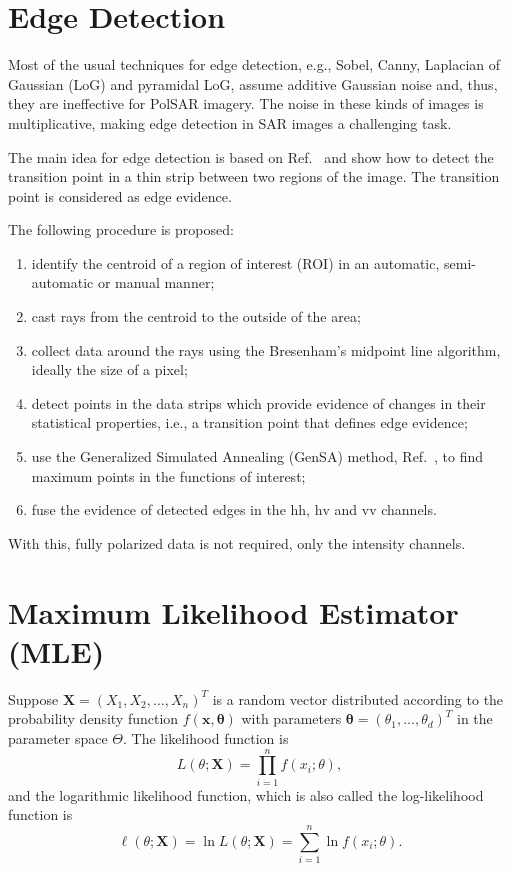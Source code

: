 \documentclass[conference]{IEEEtran}
\begin{document}
\section{Edge Detection}\label{sec_04}

Most of the usual techniques for edge detection, e.g., 
Sobel, Canny, Laplacian of Gaussian (LoG) and pyramidal LoG, assume additive Gaussian noise and, thus, they are ineffective for PolSAR imagery.
The noise in these kinds of images is multiplicative, making edge detection in SAR images a challenging task.

The main idea for edge detection is based on Ref.~\cite{nhfc, gmbf} and show how to detect the transition point in a thin strip between two regions of the image. The transition point is considered as edge evidence. 

The following procedure is proposed:
\begin{enumerate}
	\item identify the centroid of a region of interest (ROI) in an automatic, semi-automatic or manual manner;
	\item cast rays from the centroid to the outside of the area;
	\item collect data around the rays using the  Bresenham's midpoint line algorithm, ideally the size of a pixel;
	\item detect points in the data strips which provide evidence of changes in their statistical properties, i.e., a transition point that defines edge evidence;
	\item use the Generalized Simulated Annealing (GenSA) method, Ref.~\cite{xgsh}, to find maximum points in the functions of interest;
	\item fuse the evidence of detected edges in the $\text{hh}$, $\text{hv}$ and $\text{vv}$ channels.
\end{enumerate}
With this, fully polarized data is not required, only the intensity channels.

\section{Maximum Likelihood Estimator (MLE)}\label{sec_05}

Suppose $\mathbf{X}=(X_1,X_2,\dots,X_n)^T$ is a random vector distributed according to the probability density function $f(\mathbf{x},\mathbf{\theta})$ with parameters $\mathbf{\theta}=(\theta_1,\dots,\theta_d)^T$ in the parameter space $\Theta$.
The likelihood function is
\begin{equation*}
    L(\theta;\mathbf{X}) = \prod_{i=1}^{n}f(x_i;\theta),
\end{equation*}
and the logarithmic likelihood function, which is also called the log-likelihood function is
\begin{equation}
	\ell(\theta;\mathbf{X})= \ln L(\theta;\mathbf{X}) = \sum_{i=1}^{n}\ln f(x_i;\theta).
	\label{eq_05}
\end{equation}
\end{document}
